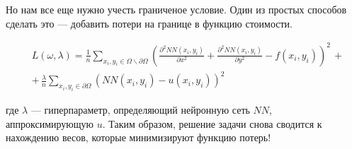 Но нам все еще нужно учесть граниченое условие. Один из простых способов сделать это --- добавить потери на границе в функцию стоимости.

\[
    \begin{split}
         & L(\omega, \lambda) = \frac{1}{n} \sum_{x_i,y_i \in \Omega \backslash \partial \Omega} \left( \frac{\partial^2 NN(x_i, y_i)}{\partial x^2} + \frac{\partial^2 NN(x_i, y_i)}{\partial y^2}  - f(x_i, y_i) \right)^2 \, + \\
         & + \, \frac{\lambda}{n}\sum_{x_i,y_i \in \partial \Omega} (NN(x_i, y_i) - u(x_i, y_i))^2
    \end{split}
\]

где $ \lambda$ --- гиперпараметр, определяющий нейронную сеть $ NN $, аппроксимирующую $ u $. Таким образом, решение задачи снова сводится к нахождению весов, которые минимизируют функцию потерь!

\begin{comment}
(под удаление либо надо что то написать про градиентный спуск)
A. Вычисление градиента
Эффективная минимизация (3) может рассматриваться как
процедуру обучения нейронной сети, где ошибка
соответствующая каждому входному вектору, является значением, которое
должна стать нулевой. В вычислении этого значения ошибки участвуют
не только выход сети (как это происходит при обычном
обучении), но и производные выхода по отношению к
любого из входов. Поэтому при вычислении градиента
ошибки относительно весов сети, нам необходимо вычислить
не только градиент сети, но и градиент
производных сети по отношению к ее входам.
Рассмотрим многослойный перцептрон с входными блоками, одним
скрытым слоем с сигмоидальными блоками и линейным выходным блоком.
Расширение на случай более чем одного скрытого слоя
может быть получено соответствующим образом. Для заданного входного вектора
выход сети имеет вид
где обозначает вес от
входного блока к скрытому блоку, обозначает вес
от скрытого блока к выходу, обозначает смещение
скрытого блока, и сигмоидальная передаточная функция. Легко
легко показать, что
\end{comment}